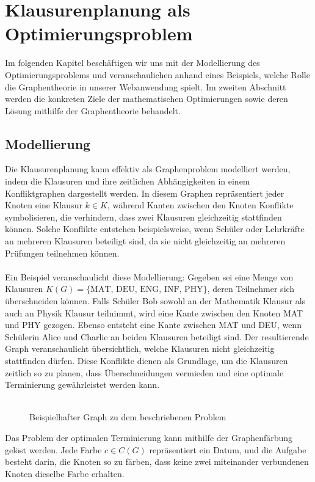 \newpage
\section{Klausurenplanung als Optimierungsproblem}

Im folgenden Kapitel beschäftigen wir uns mit der Modellierung des Optimierungsproblems und veranschaulichen anhand eines Beispiels, welche Rolle die Graphentheorie in unserer Webanwendung spielt. Im zweiten Abschnitt werden die konkreten Ziele der mathematischen Optimierungen sowie deren Lösung mithilfe der Graphentheorie behandelt.

\subsection{Modellierung}
Die Klausurenplanung kann effektiv als Graphenproblem modelliert werden, indem die Klausuren und ihre zeitlichen Abhängigkeiten in einem Konfliktgraphen dargestellt werden. In diesem Graphen repräsentiert jeder Knoten eine Klausur $k \in K$, während Kanten zwischen den Knoten Konflikte symbolisieren, die verhindern, dass zwei Klausuren gleichzeitig stattfinden können. Solche Konflikte entstehen beispielsweise, wenn Schüler oder Lehrkräfte an mehreren Klausuren beteiligt sind, da sie nicht gleichzeitig an mehreren Prüfungen teilnehmen können.\\\\
Ein Beispiel veranschaulicht diese Modellierung: Gegeben sei eine Menge von Klausuren $K(G) = \{\text{MAT, DEU, ENG, INF, PHY}\} $, deren Teilnehmer sich überschneiden können. Falls Schüler Bob sowohl an der Mathematik Klausur als auch an Physik Klausur teilnimmt, wird eine Kante zwischen den Knoten MAT und PHY gezogen. Ebenso entsteht eine Kante zwischen MAT und DEU, wenn Schülerin Alice und Charlie an beiden Klausuren beteiligt sind.
Der resultierende Graph veranschaulicht übersichtlich, welche Klausuren nicht gleichzeitig stattfinden dürfen. Diese Konflikte dienen als Grundlage, um die Klausuren zeitlich so zu planen, dass Überschneidungen vermieden und eine optimale Terminierung gewährleistet werden kann.\\\\
\begin{figure}[H]
    \centering
    \scalebox{0.7}{}
    \caption[Beispielhafter Graph des Problems]{Beispielhafter Graph zu dem beschriebenen Problem}
    \label{g4}
\end{figure}
\noindent Das Problem der optimalen Terminierung kann mithilfe der Graphenfärbung gelöst werden. Jede Farbe $ c \in C(G)$ repräsentiert ein Datum, und die Aufgabe besteht darin, die Knoten so zu färben, dass keine zwei miteinander verbundenen Knoten dieselbe Farbe erhalten. \\\\
